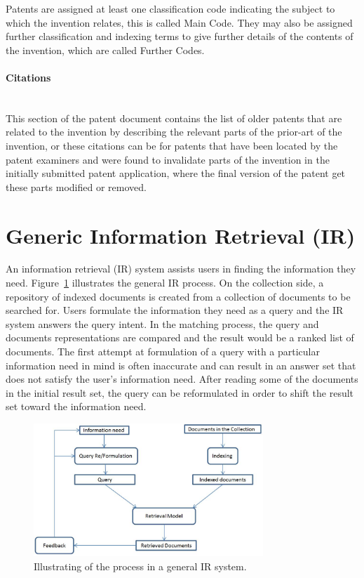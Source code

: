 Patents are assigned at least one classification code 
indicating the subject to which the invention relates, this is called Main Code. They may also be assigned further classification and 
indexing terms to give further details of the contents of the invention, which are called Further Codes. 

\paragraph{Citations}
\ \\ 
This section of the patent document contains the list of older patents that are related to the
invention by describing the relevant parts of the prior-art of the invention, or these citations can
be for patents that have been located by the patent examiners and were found to invalidate parts 
of the invention in the initially submitted patent application, where the final version of the patent
get these parts modified or removed.
\section{Generic Information Retrieval (IR)}
An information retrieval (IR) system assists users in finding the information they need. Figure~\ref{fig:generalir} illustrates the general IR process. On the collection side, a repository of indexed documents is created from a collection of documents to be searched for. Users formulate the information they need as a query and the IR system answers the query intent. In the matching process, the query and documents representations are compared and the result would be a ranked list of documents. The first attempt at formulation of a query with a particular information need in mind
is often inaccurate and can result in an answer set that does not satisfy the user's information need. 
After reading some of the documents in the initial result set, the query can be reformulated in order to shift the result set toward the information need.
\begin{figure}[htpb]
   \centering
   \includegraphics[width=.60\textwidth,height=50mm]{figs/generalIR.jpg}
   \caption{Illustrating of the process in a general IR system.}  
   \label{fig:generalir} 
\end{figure}
\FloatBarrier 
